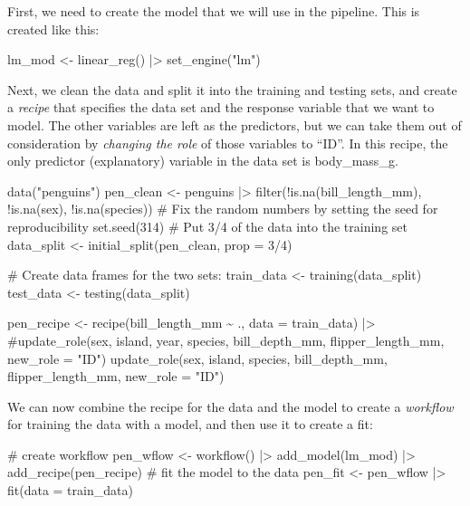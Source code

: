 \documentclass[
  letterpaper,
  DIV=11,
  numbers=noendperiod]{scrreprt}
\newenvironment{Shaded}{\begin{snugshade}}{\end{snugshade}}
\newcommand{\NormalTok}[1]{\textcolor[rgb]{0.00,0.23,0.31}{#1}}
\begin{document}
First, we need to create the model that we will use in the pipeline.
This is created like this:

\begin{Shaded}
\begin{Highlighting}[]
\NormalTok{lm\_mod \textless{}{-} }
\NormalTok{  linear\_reg() |\textgreater{} }
\NormalTok{  set\_engine("lm")}
\end{Highlighting}
\end{Shaded}

Next, we clean the data and split it into the training and testing sets,
and create a \emph{recipe} that specifies the data set and the response
variable that we want to model. The other variables are left as the
predictors, but we can take them out of consideration by \emph{changing
the role} of those variables to ``ID''. In this recipe, the only
predictor (explanatory) variable in the data set is body\_mass\_g.

\begin{Shaded}
\begin{Highlighting}[]
\NormalTok{data("penguins")}
\NormalTok{pen\_clean \textless{}{-} penguins |\textgreater{} filter(!is.na(bill\_length\_mm), !is.na(sex), !is.na(species))}
\NormalTok{\# Fix the random numbers by setting the seed  for reproducibility}
\NormalTok{set.seed(314)}
\NormalTok{\# Put 3/4 of the data into the training set }
\NormalTok{data\_split \textless{}{-} initial\_split(pen\_clean, prop = 3/4)}

\NormalTok{\# Create data frames for the two sets:}
\NormalTok{train\_data \textless{}{-} training(data\_split)}
\NormalTok{test\_data  \textless{}{-} testing(data\_split)}

\NormalTok{pen\_recipe \textless{}{-} }
\NormalTok{  recipe(bill\_length\_mm \textasciitilde{} ., data = train\_data) |\textgreater{} }
\NormalTok{  \#update\_role(sex, island, year, species, bill\_depth\_mm, flipper\_length\_mm, new\_role = "ID")}
\NormalTok{  update\_role(sex, island, species, bill\_depth\_mm, flipper\_length\_mm, new\_role = "ID") }
\end{Highlighting}
\end{Shaded}

We can now combine the recipe for the data and the model to create a
\emph{workflow} for training the data with a model, and then use it to
create a fit:

\begin{Shaded}
\begin{Highlighting}[]
\NormalTok{\# create workflow}
\NormalTok{pen\_wflow \textless{}{-} }
\NormalTok{  workflow() |\textgreater{} }
\NormalTok{  add\_model(lm\_mod) |\textgreater{} }
\NormalTok{  add\_recipe(pen\_recipe)}
\NormalTok{\# fit the model to the data}
\NormalTok{pen\_fit \textless{}{-} }
\NormalTok{  pen\_wflow |\textgreater{} }
\NormalTok{  fit(data = train\_data)}
\end{Highlighting}
\end{Shaded}
\end{document}
